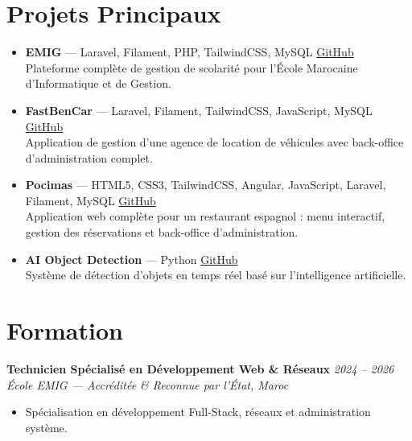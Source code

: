 \documentclass[11pt,a4paper,sans]{article}
\begin{document}
\section*{Projets Principaux}
\begin{itemize}[leftmargin=0.5cm, itemsep=2pt]

    \item \textbf{EMIG} \textcolor{medgray}{--- Laravel, Filament, PHP, TailwindCSS, MySQL} \hfill \href{https://github.com/aminejhilel/gestion_scolarite_filament}{\textcolor{primary}{GitHub}}\\
    Plateforme complète de gestion de scolarité pour l'École Marocaine d'Informatique et de Gestion.

    \item \textbf{FastBenCar} \textcolor{medgray}{--- Laravel, Filament, TailwindCSS, JavaScript, MySQL} \hfill \href{https://github.com/aminejhilel/location_voiture}{\textcolor{primary}{GitHub}}\\
    Application de gestion d'une agence de location de véhicules avec back-office d'administration complet.

    \item \textbf{Pocimas} \textcolor{medgray}{--- HTML5, CSS3, TailwindCSS, Angular, JavaScript, Laravel, Filament, MySQL} \hfill \href{https://github.com/aminejhilel/restaurant-pocimas}{\textcolor{primary}{GitHub}}\\
    Application web complète pour un restaurant espagnol : menu interactif, gestion des réservations et back-office d'administration.

    \item \textbf{AI Object Detection} \textcolor{medgray}{--- Python} \hfill \href{https://github.com/aminejhilel/ai-object-detevtion}{\textcolor{primary}{GitHub}}\\
    Système de détection d'objets en temps réel basé sur l'intelligence artificielle.

\end{itemize}

\section*{Formation}

\textbf{Technicien Spécialisé en Développement Web \& Réseaux} \hfill \textit{2024 -- 2026}\\
\textit{École EMIG --- Accréditée \& Reconnue par l'État, Maroc}
\begin{itemize}[leftmargin=0.5cm, itemsep=1pt]
    \item Spécialisation en développement Full-Stack, réseaux et administration système.

\end{itemize}
\end{document}
